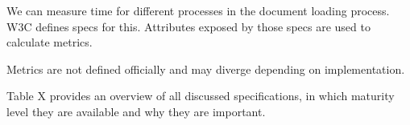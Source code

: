 We can measure time for different processes in the document loading process.
W3C defines specs for this.
Attributes exposed by those specs are used to calculate metrics.

Metrics are not defined officially and may diverge depending on implementation.

Table X provides an overview of all discussed specifications, in which maturity level they are available and why they are important.






